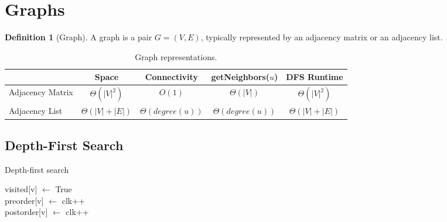 \documentclass[11pt]{article}
\theoremstyle{definition}
\newtheorem{definition}{Definition}[section]
\theoremstyle{remark}
\begin{document}
\section{Graphs}
\begin{definition}[Graph] A graph is a pair $G=(V,E)$, typically represented by an adjacency matrix or an adjacency list.
\end{definition}

\begin{table}[ht]
\centering
\caption{Graph representations.}
\begin{tabular}[t]{lcccc}
\hline
& Space & Connectivity & getNeighbors($u$) & DFS Runtime\\
\hline
Adjacency Matrix & $\Theta(|V|^2)$ & $O(1)$ & $\Theta(|V|)$ & $\Theta(|V|^2)$\\
Adjacency List & $\Theta(|V|+|E|)$ & $\Theta(degree(u))$ & $\Theta(degree(u))$ & $\Theta(|V|+|E|)$ \\
\hline
\end{tabular}
\end{table}

\newpage
\subsection{Depth-First Search}
\begin{algorithm}[ht]
    \caption{Depth-first search}
 
    \DontPrintSemicolon
    
    
	 {
		visited[v] $\gets$ True \\
		preorder[v] $\gets$ clk++ \\
		postorder[v] $\gets$ clk++ \\
	}
\end{algorithm}
\end{document}
